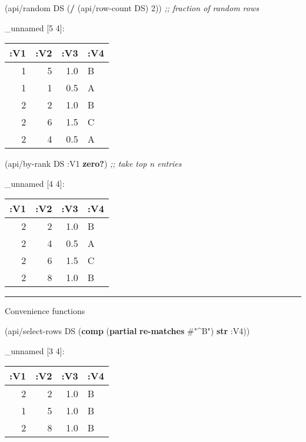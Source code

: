 \documentclass[]{article}
\newenvironment{Shaded}{\begin{snugshade}}{\end{snugshade}}
\newcommand{\KeywordTok}[1]{\textcolor[rgb]{0.13,0.29,0.53}{\textbf{#1}}}
\newcommand{\DecValTok}[1]{\textcolor[rgb]{0.00,0.00,0.81}{#1}}
\newcommand{\SpecialStringTok}[1]{\textcolor[rgb]{0.31,0.60,0.02}{#1}}
\newcommand{\CommentTok}[1]{\textcolor[rgb]{0.56,0.35,0.01}{\textit{#1}}}
\newcommand{\AttributeTok}[1]{\textcolor[rgb]{0.77,0.63,0.00}{#1}}
\newcommand{\NormalTok}[1]{#1}
\begin{document}
\begin{Shaded}
\begin{Highlighting}[]
\NormalTok{(api/random DS (}\KeywordTok{/}\NormalTok{ (api/row-count DS) }\DecValTok{2}\NormalTok{)) }\CommentTok{;; fraction of random rows}
\end{Highlighting}
\end{Shaded}

\_unnamed {[}5 4{]}:

\begin{longtable}[]{@{}rrrl@{}}
\toprule
:V1 & :V2 & :V3 & :V4\tabularnewline
\midrule
\endhead
1 & 5 & 1.0 & B\tabularnewline
1 & 1 & 0.5 & A\tabularnewline
2 & 2 & 1.0 & B\tabularnewline
2 & 6 & 1.5 & C\tabularnewline
2 & 4 & 0.5 & A\tabularnewline
\bottomrule
\end{longtable}

\begin{Shaded}
\begin{Highlighting}[]
\NormalTok{(api/by-rank DS }\AttributeTok{:V1} \KeywordTok{zero?}\NormalTok{) }\CommentTok{;; take top n entries}
\end{Highlighting}
\end{Shaded}

\_unnamed {[}4 4{]}:

\begin{longtable}[]{@{}rrrl@{}}
\toprule
:V1 & :V2 & :V3 & :V4\tabularnewline
\midrule
\endhead
2 & 2 & 1.0 & B\tabularnewline
2 & 4 & 0.5 & A\tabularnewline
2 & 6 & 1.5 & C\tabularnewline
2 & 8 & 1.0 & B\tabularnewline
\bottomrule
\end{longtable}

\begin{center}\rule{0.5\linewidth}{0.5pt}\end{center}

Convenience functions

\begin{Shaded}
\begin{Highlighting}[]
\NormalTok{(api/select-rows DS (}\KeywordTok{comp}\NormalTok{ (}\KeywordTok{partial} \KeywordTok{re-matches} \SpecialStringTok{#"^B"}\NormalTok{) }\KeywordTok{str} \AttributeTok{:V4}\NormalTok{))}
\end{Highlighting}
\end{Shaded}

\_unnamed {[}3 4{]}:

\begin{longtable}[]{@{}rrrl@{}}
\toprule
:V1 & :V2 & :V3 & :V4\tabularnewline
\midrule
\endhead
2 & 2 & 1.0 & B\tabularnewline
1 & 5 & 1.0 & B\tabularnewline
2 & 8 & 1.0 & B\tabularnewline
\bottomrule
\end{longtable}
\end{document}
